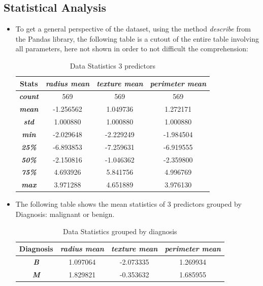 \documentclass[conference]{IEEEtran}
\begin{document}
\subsection{Statistical Analysis}
\begin{itemize}
\item To get a general perspective of the dataset, using the method \textit{describe} from the Pandas library, the following table is a cutout of the entire table involving all parameters, here not shown in order to not difficult the comprehension: 

\begin{table}[htbp]
\caption{Data Statistics 3 predictors}
\begin{center}
\begin{tabular}{|c|c|c|c|}
    \hline
    \cline{2-4} 
    \textbf{Stats} & \textbf{\textit{radius mean}}& \textbf{\textit{texture mean}}& \textbf{\textit{perimeter mean}} \\
    \hline
    \textbf{\textit{count}}& 569 & 569 & 569  \\
    \hline
    \textbf{\textit{mean}}&  -1.256562 & 1.049736 & 1.272171 \\
    \hline
    \textbf{\textit{std}}& 1.000880 & 1.000880 & 1.000880 \\ 
    \hline
    \textbf{\textit{min}} &-2.029648  & -2.229249 & -1.984504 \\ 
    \hline
    \textbf{\textit{25\%}}& -6.893853 &-7.259631	& -6.919555 \\
    \hline
    \textbf{\textit{50\%}}& -2.150816 &-1.046362 & -2.359800 \\ 
    \hline
    \textbf{\textit{75\%}}& 4.693926	& 5.841756 &4.996769 \\ 
    \hline
    \textbf{\textit{max}}& 3.971288 & 4.651889 & 3.976130 \\ 
    \hline
\end{tabular}
\label{tab1}
\end{center}
\end{table}

\item The following table shows the mean statistics of 3 predictors grouped by 
Diagnosis: malignant or benign.


\begin{table}[htbp]
\caption{Data Statistics grouped by diagnosis}
\begin{center}
\begin{tabular}{|c|c|c|c|}
\hline

\cline{2-4} 
\textbf{Diagnosis} & \textbf{\textit{radius mean}}& \textbf{\textit{texture mean}}& \textbf{\textit{perimeter mean}} \\
\hline
\textbf{\textit{B}}& 1.097064 &-2.073335 &	1.269934  \\
\hline
\textbf{\textit{M}}& 1.829821 & -0.353632 & 1.685955 \\
\hline
\end{tabular}
\label{tab1}
\end{center}
\end{table}

\end{itemize}
\end{document}
